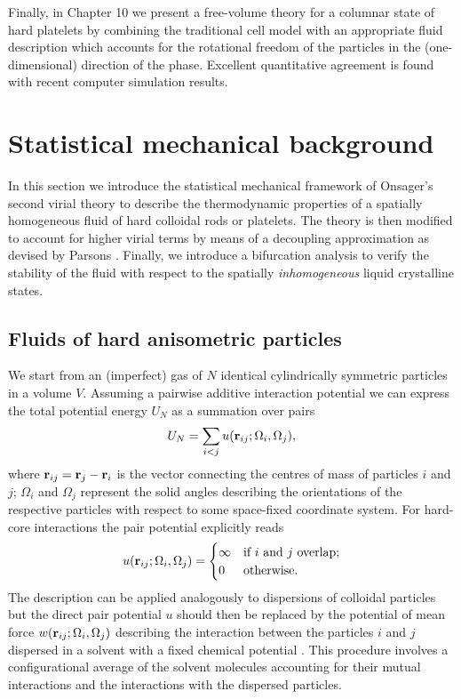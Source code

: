 {Finally, in Chapter  10  we present a free-volume theory for a columnar state of hard platelets  by combining the traditional cell model with an appropriate fluid description which accounts for the rotational freedom of the particles in the (one-dimensional) direction of the phase. Excellent quantitative agreement is found with recent computer simulation results.



\section{Statistical mechanical background}
\noindent In this section we introduce the statistical mechanical framework
of  Onsager's second virial theory \cite{onsager1949,Vroege92,Cotter} to
describe the thermodynamic properties of a spatially homogeneous fluid of
hard colloidal rods or
platelets. The theory is then modified to account for
higher virial terms by means of a decoupling approximation as devised by Parsons \cite{Parsons}.
Finally, we introduce a bifurcation analysis to verify  the stability of the  fluid
with respect to the spatially {\em inhomogeneous} liquid crystalline states.

\subsection{Fluids of hard anisometric particles}
We start from an (imperfect) gas of $N$ identical cylindrically symmetric particles in a volume $V$.
Assuming a pairwise additive interaction potential we can express the total potential energy $U_{N}$  as a summation over pairs
\begin{equation}
U_{N}=\sum_{i<j} u({\bf r}_{ij}; \Omega_{i}, \Omega_{j}),
\end{equation}
where ${\bf r}_{ij}={\bf r} _{j}- {\bf r} _{i}$ is the vector connecting the centres of mass of particles $i$ and $j$;
$\Omega_{i}$ and $\Omega_{j}$ represent the solid angles describing the orientations of
the respective particles with respect to some space-fixed coordinate system.
For hard-core interactions the pair potential explicitly reads
\begin{equation}
u({\bf r}_{ij}; \Omega_{i}, \Omega_{j}) =
\begin{cases}
\infty  &\text{if $i$ and $j$ overlap;} \\
0 &\text{otherwise.} \label{0pairpot}
\end{cases}
\end{equation}
The  description can be applied analogously to dispersions of colloidal particles
 but the direct pair potential $u$
 should then be replaced by the potential of mean force $w({\bf r}_{ij};\Omega_{i},\Omega_{j})$ describing
the interaction between the  particles $i$ and $j$
dispersed in a  solvent with a fixed chemical potential \cite{macmillan,Hill}.
This procedure involves a configurational average of the solvent molecules accounting for
their mutual interactions and the interactions with the dispersed particles.

}
